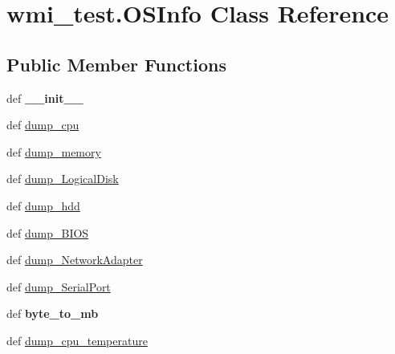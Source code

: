 \hypertarget{classwmi__test_1_1_o_s_info}{\section{wmi\-\_\-test.\-O\-S\-Info Class Reference}
\label{classwmi__test_1_1_o_s_info}
}
\subsection*{Public Member Functions}
\begin{DoxyCompactItemize}
\item 
\hypertarget{classwmi__test_1_1_o_s_info_a460bdb736471d54f77cc98ad19cbf9a2}{def {\bfseries \-\_\-\-\_\-init\-\_\-\-\_\-}}\label{classwmi__test_1_1_o_s_info_a460bdb736471d54f77cc98ad19cbf9a2}

\item 
def \hyperlink{classwmi__test_1_1_o_s_info_a15da393315c28657930b70e2d669a674}{dump\-\_\-cpu}
\item 
def \hyperlink{classwmi__test_1_1_o_s_info_a4bca00d47f6bb0b3257c44e29d30b1c1}{dump\-\_\-memory}
\item 
def \hyperlink{classwmi__test_1_1_o_s_info_aa91cca06ca87a8fe5c3d3a1418592e96}{dump\-\_\-\-Logical\-Disk}
\item 
def \hyperlink{classwmi__test_1_1_o_s_info_a7c3a4cca9dd30547d6fb65105026eddd}{dump\-\_\-hdd}
\item 
def \hyperlink{classwmi__test_1_1_o_s_info_a8f15bf9e5606d5a5616d50a85ab9b933}{dump\-\_\-\-B\-I\-O\-S}
\item 
def \hyperlink{classwmi__test_1_1_o_s_info_ac69670797ca736fa5b8b05a181a1bd9b}{dump\-\_\-\-Network\-Adapter}
\item 
def \hyperlink{classwmi__test_1_1_o_s_info_ade3df3321b93d357b15dc7d14e711f1f}{dump\-\_\-\-Serial\-Port}
\item 
\hypertarget{classwmi__test_1_1_o_s_info_aafc1fbceacd53a9d4ea4d833681fea75}{def {\bfseries byte\-\_\-to\-\_\-mb}}\label{classwmi__test_1_1_o_s_info_aafc1fbceacd53a9d4ea4d833681fea75}

\item 
def \hyperlink{classwmi__test_1_1_o_s_info_acafa1f987f247ff41c5fc8c43f3d90ef}{dump\-\_\-cpu\-\_\-temperature}
\end{DoxyCompactItemize}


